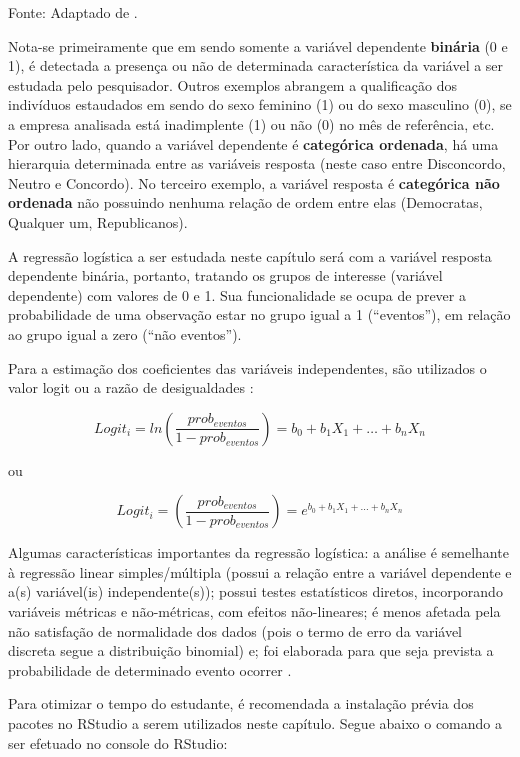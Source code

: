\documentclass[12pt,brazil,]{book}
\begin{document}
Fonte: Adaptado de \textcite{Torres-Reyna2014}.

Nota-se primeiramente que em sendo somente a variável dependente
\textbf{binária} (0 e 1), é detectada a presença ou não de determinada
característica da variável a ser estudada pelo pesquisador. Outros
exemplos abrangem a qualificação dos indivíduos estaudados em sendo do
sexo feminino (1) ou do sexo masculino (0), se a empresa analisada está
inadimplente (1) ou não (0) no mês de referência, etc. Por outro lado,
quando a variável dependente é \textbf{categórica ordenada}, há uma
hierarquia determinada entre as variáveis resposta (neste caso entre
Disconcordo, Neutro e Concordo). No terceiro exemplo, a variável
resposta é \textbf{categórica não ordenada} não possuindo nenhuma
relação de ordem entre elas (Democratas, Qualquer um, Republicanos).

A regressão logística a ser estudada neste capítulo será com a variável
resposta dependente binária, portanto, tratando os grupos de interesse
(variável dependente) com valores de 0 e 1. Sua funcionalidade se ocupa
de prever a probabilidade de uma observação estar no grupo igual a 1
(``eventos''), em relação ao grupo igual a zero (``não eventos'').

Para a estimação dos coeficientes das variáveis independentes, são
utilizados o valor logit ou a razão de desigualdades
\autocite{Hair2009}:

\[
Logit_i=ln\left (\frac{prob_{eventos}}{1-prob_{eventos}}  \right )=b_0+b_1X_1+\ldots+b_nX_n
\]

ou

\[
Logit_i=\left (\frac{prob_{eventos}}{1-prob_{eventos}}  \right )=e^{b_0+b_1X_1+\ldots+b_nX_n}
\]

Algumas características importantes da regressão logística: a análise é
semelhante à regressão linear simples/múltipla (possui a relação entre a
variável dependente e a(s) variável(is) independente(s)); possui testes
estatísticos diretos, incorporando variáveis métricas e não-métricas,
com efeitos não-lineares; é menos afetada pela não satisfação de
normalidade dos dados (pois o termo de erro da variável discreta segue a
distribuição binomial) e; foi elaborada para que seja prevista a
probabilidade de determinado evento ocorrer \autocite{Hair2009}.

Para otimizar o tempo do estudante, é recomendada a instalação prévia
dos pacotes no RStudio a serem utilizados neste capítulo. Segue abaixo o
comando a ser efetuado no console do RStudio:
\end{document}
